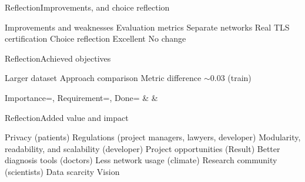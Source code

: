 \begin{frame}{Reflection}{Improvements, and choice reflection}
\begin{outline}
    \0 Improvements and weaknesses
    \1 Evaluation metrics
    \1 Separate networks
    \1 Real TLS certification
    \vspace{0.5cm}
    \0 Choice reflection
    \1 Excellent
    \1 No change
\end{outline}
\end{frame}

\begin{frame}{Reflection}{Achieved objectives}
\begin{outline}
    \1 Larger dataset
    \1 Approach comparison
    \1 Metric difference $\sim 0.03$ (train)
\end{outline}
\footnotesize
\begin{table}[htb]\centering
    {Importance=\importance, Requirement=\requirement, Done=\done}{%
        \importance & \requirement & \done
    }
    \caption{\footnotesize Red color represents MVP, orange and blue represent broader or ultimate scope. Bold requirements was shown in the demo. }\label{tab:requirements-with-scope-and-completion}
\end{table}
\normal
\end{frame}

\begin{frame}{Reflection}{Added value and impact}
\begin{outline}
    \1 Privacy (patients)
    \1 Regulations (project managers, lawyers, developer)
    \1 Modularity, readability, and scalability (developer)
    \1 Project opportunities (Result)
    \1 Better diagnosis tools (doctors)
    \1 Less network usage (climate)
    \1 Research community (scientists)
        \2 Data scarcity
        \2 Vision
\end{outline}
\end{frame}

